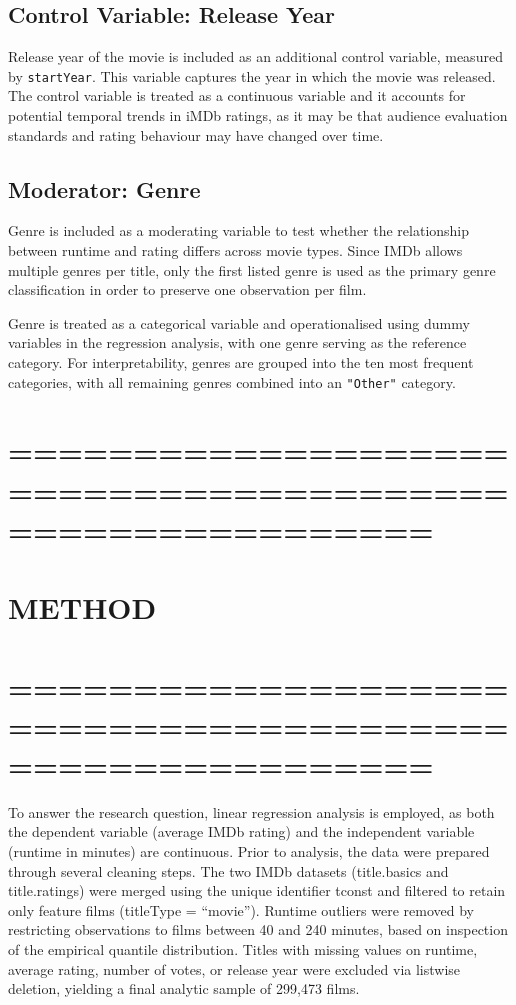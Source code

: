 \documentclass[
]{article}
\begin{document}
\subsection{Control Variable: Release
Year}\label{control-variable-release-year}

Release year of the movie is included as an additional control variable,
measured by \texttt{startYear}. This variable captures the year in which
the movie was released. The control variable is treated as a continuous
variable and it accounts for potential temporal trends in iMDb ratings,
as it may be that audience evaluation standards and rating behaviour may
have changed over time.

\subsection{Moderator: Genre}\label{moderator-genre}

Genre is included as a moderating variable to test whether the
relationship between runtime and rating differs across movie types.
Since IMDb allows multiple genres per title, only the first listed genre
is used as the primary genre classification in order to preserve one
observation per film.

Genre is treated as a categorical variable and operationalised using
dummy variables in the regression analysis, with one genre serving as
the reference category. For interpretability, genres are grouped into
the ten most frequent categories, with all remaining genres combined
into an \texttt{"Other"} category.

\section{=========================================================}\label{section-6}

\section{METHOD}\label{method}

\section{=========================================================}\label{section-7}

To answer the research question, linear regression analysis is employed,
as both the dependent variable (average IMDb rating) and the independent
variable (runtime in minutes) are continuous. Prior to analysis, the
data were prepared through several cleaning steps. The two IMDb datasets
(title.basics and title.ratings) were merged using the unique identifier
tconst and filtered to retain only feature films (titleType =
``movie''). Runtime outliers were removed by restricting observations to
films between 40 and 240 minutes, based on inspection of the empirical
quantile distribution. Titles with missing values on runtime, average
rating, number of votes, or release year were excluded via listwise
deletion, yielding a final analytic sample of 299,473 films.
\end{document}
